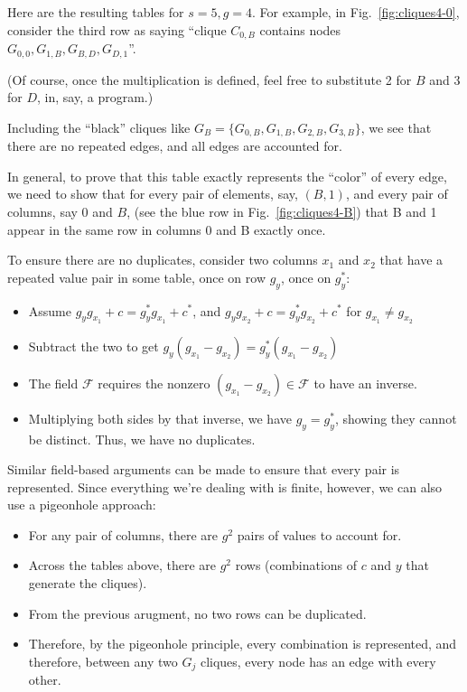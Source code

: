 \documentclass[11pt, oneside]{article} 	%
\begin{document}
Here are the resulting tables for $s=5, g=4$. For example, in Fig.~\ref{fig:cliques4-0}, consider the third row as saying ``clique $C_{0,B}$ contains nodes $G_{0,0}, G_{1,B}, G_{B,D}, G_{D,1}$''.


(Of course, once the multiplication is defined, feel free to substitute 2 for $B$ and 3 for $D$, in, say, a program.)


Including the ``black'' cliques like $G_B = \{G_{0,B}, G_{1,B}, G_{2,B}, G_{3,B}\}$, we see that there are no repeated edges, and all edges are accounted for. 

In general, to prove that this table exactly represents the ``color'' of every edge, we need to show that for every pair of elements, say, $(B, 1)$, and every pair of columns, say $0$ and $B$, (see the blue row in Fig.~\ref{fig:cliques4-B}) that B and 1 appear in the same row in columns 0 and B exactly once. 

To ensure there are no duplicates, consider two columns $x_1$ and $x_2$ that have a repeated value pair in some table, once on row $g_y$, once on $g_y^*$:

\begin{itemize}
\item Assume $g_yg_{x_1} + c = g_y^*g_{x_1} +c^*$, and $g_yg_{x_2} + c = g_y^*g_{x_2} +c^*$ for $g_{x_1} \neq g_{x_2}$
\item Subtract the two to get $g_y(g_{x_1} - g_{x_2}) = g_y^*(g_{x_1} - g_{x_2})$
\item The field $\mathcal{F}$ requires the nonzero $(g_{x_1} - g_{x_2}) \in \mathcal{F}$ to have an inverse. 
\item Multiplying both sides by that inverse, we have $g_y = g_y^*$, showing they cannot be distinct. Thus, we have no duplicates.
\end{itemize}

Similar field-based arguments can be made to ensure that every pair is represented. Since everything we're dealing with is finite, however, we can also use a pigeonhole approach:
\begin{itemize}
\item For any pair of columns, there are $g^2$ pairs of values to account for.
\item Across the tables above, there are $g^2$ rows (combinations of $c$ and $y$ that generate the cliques).
\item From the previous arugment, no two rows can be duplicated.
\item Therefore, by the pigeonhole principle, every combination is represented, and therefore, between any two $G_j$ cliques, every node has an edge with every other.
\end{itemize}
\end{document}
